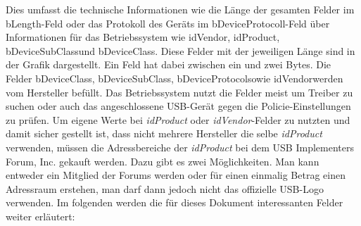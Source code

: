 Dies umfasst die technische Informationen wie die Länge der gesamten Felder im \glqq bLength\grqq-Feld oder das Protokoll des Geräts im \glqq bDeviceProtocoll\grqq-Feld über Informationen für das Betriebssystem wie \glqq idVendor\grqq, \glqq idProduct\grqq, \glqq bDeviceSubClass\grqq und \glqq bDeviceClass\grqq. Diese Felder mit der jeweiligen Länge sind in der Grafik dargestellt. Ein Feld hat dabei zwischen ein und zwei Bytes. Die Felder \glqq bDeviceClass\grqq, \glqq bDeviceSubClass\grqq, \glqq bDeviceProtocol\grqq sowie \glqq idVendor\grqq werden vom Hersteller befüllt.\cite{USBDesk} Das Betriebssystem nutzt die Felder meist um Treiber zu suchen oder auch das angeschlossene USB-Gerät gegen die Policie-Einstellungen zu prüfen. Um eigene Werte bei \textit{idProduct} oder \textit{idVendor}-Felder zu nutzten und damit sicher gestellt ist, dass nicht mehrere Hersteller die selbe \textit{idProduct} verwenden, müssen die Adressbereiche der \textit{idProduct} bei dem USB Implementers Forum, Inc. gekauft werden. Dazu gibt es zwei Möglichkeiten. Man kann entweder ein Mitglied der Forums werden oder für einen einmalig Betrag einen Adressraum erstehen, man darf dann jedoch nicht das offizielle USB-Logo verwenden. \cite{USBVendor} Im folgenden werden die für dieses Dokument interessanten Felder weiter erläutert:

